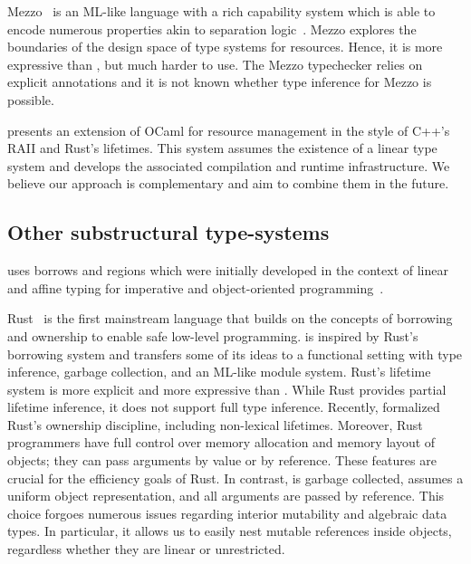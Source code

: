 Mezzo~\citep{DBLP:phd/hal/Protzenko14} is an ML-like language
with a rich capability system which is able to encode numerous
properties akin to separation logic~\citep{DBLP:conf/lics/Reynolds02}.
Mezzo explores the  boundaries of the design space of type systems for
resources. Hence, it is more expressive than \lang, but
much harder to use. The Mezzo typechecker relies on explicit
annotations and it is not known whether type inference for Mezzo is possible.

\citet{DBLP:journals/corr/abs-1803-02796} presents
an extension of OCaml for resource management in the style of C++'s RAII
and Rust's lifetimes. This system assumes
the existence of a linear type system and develops the associated compilation
and runtime infrastructure. We believe our approach is
complementary and aim to combine them in the future.

\subsection{Other substructural type-systems}

\lang uses borrows and regions
which were initially developed in the context of linear and affine
typing for  imperative and
object-oriented
programming~\citep{DBLP:conf/popl/BoylandR05,DBLP:conf/pldi/GrossmanMJHWC02}.

Rust~\citep{rust} is the first
mainstream language that builds on the concepts of borrowing and ownership
to enable safe low-level programming.
\lang is inspired by Rust's borrowing system and transfers some of its
ideas  to a functional setting with type inference, garbage collection, and
an ML-like module system.
Rust's lifetime system is more explicit and more expressive than \lang.
While Rust provides partial lifetime inference, it
does not support full type inference. 
Recently, \citet{DBLP:journals/corr/abs-1903-00982}
formalized Rust's ownership discipline, including non-lexical lifetimes.
Moreover, Rust programmers have full control over memory allocation
and memory layout of objects; they can pass arguments by value or by reference.
These features are crucial for the efficiency goals of Rust.
In contrast, \lang is garbage collected, assumes a uniform object
representation, and all arguments are passed by reference. This choice
forgoes numerous  
issues regarding interior mutability and algebraic data types.
In particular, it
allows us to easily nest mutable references inside objects, regardless
whether they are linear or unrestricted.

